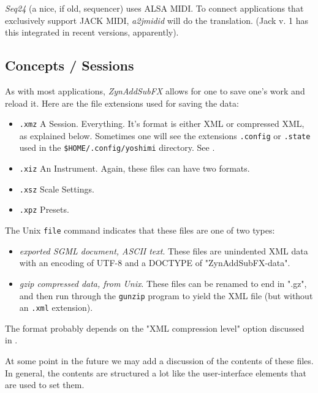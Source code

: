    \textsl{Seq24} (a nice, if old, sequencer) uses ALSA MIDI. To connect
   applications that exclusively support JACK MIDI, \textsl{a2jmidid} will
   do the translation.  (Jack v. 1 has this integrated in recent versions,
   apparently).

\subsection{Concepts / Sessions}
\label{subsec:concepts_sessions}

   As with most applications, \textsl{ZynAddSubFX}
   allows for one to save one's work and reload it.
   Here are the file extensions used for saving the data:

   \begin{itemize}
      \item \texttt{.xmz} A Session. Everything.  It's format is either XML
      or compressed XML, as explained below.  Sometimes one will see the
      extensions \texttt{.config} or \texttt{.state} used in the
      \texttt{\$HOME/.config/yoshimi} directory.
      See .
      \item \texttt{.xiz} An Instrument.  Again, these files can have two
      formats.
      \item \texttt{.xsz} Scale Settings.
      \item \texttt{.xpz} Presets.
   \end{itemize}

   The Unix \texttt{file} command indicates that these files are one of
   two types:

   \begin{itemize}
      \item \textsl{exported SGML document, ASCII text}.
         These files are unindented XML data with an encoding of UTF-8 and
         a DOCTYPE of "ZynAddSubFX-data".
      \item \textsl{gzip compressed data, from Unix}.
         These files can be renamed to end in ".gz", and then run through
         the \texttt{gunzip} program to yield the XML file (but without an
         \texttt{.xml} extension).
   \end{itemize}

   The format probably depends on the "XML compression level" option
   discussed in
   .

   At some point in the future we may add a discussion of the contents of
   these files.  In general, the contents are structured a lot like the
   user-interface elements that are used to set them.

